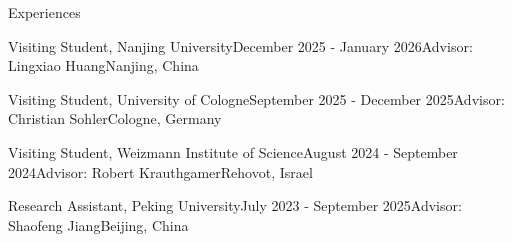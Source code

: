 \documentclass{resume} %
\begin{document}
\begin{rSection}{Experiences}{}
    \begin{rSubsection}{Visiting Student, Nanjing University}{December 2025 - January 2026}{Advisor: Lingxiao Huang}{Nanjing, China}
        
    \end{rSubsection}

    \begin{rSubsection}{Visiting Student, University of Cologne}{September 2025 - December 2025}{Advisor: Christian Sohler}{Cologne, Germany}
        
    \end{rSubsection}


    \begin{rSubsection}{Visiting Student, Weizmann Institute of Science}{August 2024 - September 2024}{Advisor: Robert Krauthgamer}{Rehovot, Israel}
    \end{rSubsection}

    \begin{rSubsection}{Research Assistant, Peking University}{July 2023 - September 2025}{Advisor: Shaofeng Jiang}{Beijing, China}
    \end{rSubsection}


\end{rSection}
\end{document}
